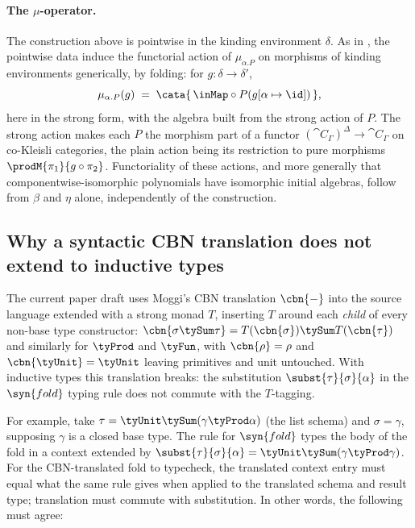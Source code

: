 \paragraph{The $\mu$-operator.}
The construction above is pointwise in the kinding environment $\delta$. As in
\citet[Proposition~4]{nunes2023}, the pointwise data induce the functorial action of $\mu_{\alpha.P}$ on
morphisms of kinding environments
generically, by folding: for $g : \delta \to \delta'$,
\[
  \mu_{\alpha.P}(g) \;=\; \cata{\,\inMap \circ P(g[\alpha \mapsto \id])\,},
\]
here in the strong form, with the algebra built from the strong action of $P$.
The strong action makes each $P$ the morphism part of a functor $(\cat{C}_\Gamma)^\Delta \to
\cat{C}_\Gamma$ on co-Kleisli categories, the plain action being its restriction to pure morphisms
$\prodM{\pi_1}{g \circ \pi_2}$. Functoriality of these actions, and more generally that
componentwise-isomorphic polynomials have isomorphic initial algebras, follow from $\beta$ and $\eta$
alone, independently of the construction.

\subsection{Why a syntactic CBN translation does not extend to inductive types}
\label{sec:polynomial-types:no-cbn}

The current paper draft uses Moggi's CBN translation $\cbn{-}$ into the source language extended
with a strong monad $T$, inserting $T$ around each \emph{child} of every
non-base type constructor: $\cbn{\sigma \tySum \tau} = T(\cbn{\sigma}) \tySum T(\cbn{\tau})$ and
similarly for $\tyProd$ and $\tyFun$, with $\cbn{\rho} = \rho$ and $\cbn{\tyUnit} = \tyUnit$
leaving primitives and unit untouched. With inductive types this translation breaks: the
substitution $\subst{\tau}{\sigma}{\alpha}$ in the $\syn{fold}$ typing rule does not commute with
the $T$-tagging.

For example, take $\tau = \tyUnit \tySum (\gamma \tyProd \alpha)$ (the list schema) and $\sigma =
\gamma$, supposing $\gamma$ is a closed base type. The rule for $\syn{fold}$ types the body of the
fold in a context extended by $\subst{\tau}{\sigma}{\alpha} = \tyUnit \tySum (\gamma \tyProd
\gamma)$. For the CBN-translated fold to typecheck, the translated context entry must equal what
the same rule gives when applied to the translated schema and result type; translation must
commute with substitution. In other words, the following must agree:

